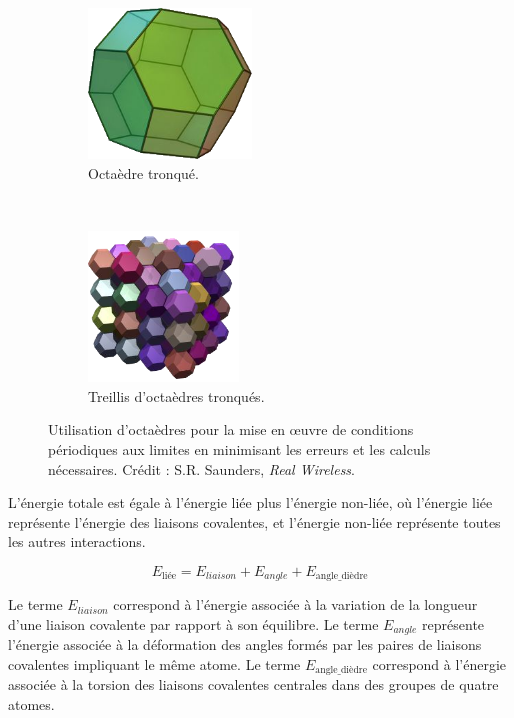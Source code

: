 \begin{appendices}
		
	\begin{figure}[!htbp]
		\begin{subfigure}{.49\textwidth}
			\centering
			\includegraphics[height=4cm]{./figures/ch1/truncOctahedron}
			\caption{Octaèdre tronqué.}
			\label{fig:truncOctahedron}
		\end{subfigure}
		~
		\begin{subfigure}{.49\textwidth}
			\centering
			\includegraphics[height=4cm]{./figures/ch1/truncOctahedra}
			\caption{Treillis d'octaèdres tronqués.}
			\label{fig:truncOctahedra}
		\end{subfigure}
		\caption[Octaèdres pour les conditions périodiques aux limites]{Utilisation d'octaèdres pour la mise en œuvre de conditions périodiques aux limites en minimisant les erreurs et les calculs nécessaires. Crédit : S.R. Saunders, \emph{Real Wireless}\footnotemark.}
		\label{fig:octa}
	\end{figure}
	
	
	L'énergie totale est égale à l'énergie liée plus l'énergie non-liée, où l'énergie liée représente l'énergie des liaisons covalentes, et l'énergie non-liée représente toutes les autres interactions.
	
	\begin{equation}
		\label{eq:ebonded}
		E_\text{liée} = E_{liaison} + E_{angle} + E_\text{angle\_{}dièdre}
	\end{equation}
	
	Le terme $E_{liaison}$ correspond à l'énergie associée à la variation de la longueur d'une liaison covalente par rapport à son équilibre. Le terme $E_{angle}$ représente l'énergie associée à la déformation des angles formés par les paires de liaisons covalentes impliquant le même atome. Le terme $E_\text{angle\_{}dièdre}$ correspond à l'énergie associée à la \og torsion \fg{} des liaisons covalentes centrales dans des groupes de quatre atomes.
	

\end{appendices}
